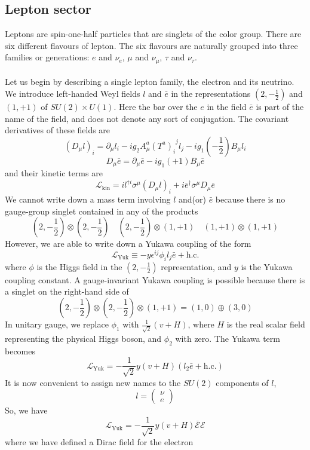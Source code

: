 \subsection{Lepton sector}
Leptons are spin-one-half particles that are singlets of the color group. There are six different flavours of lepton. The six flavours are naturally grouped into three families or generations: $e$ and $\nu_e$, $\mu$ and $\nu_{\mu}$, $\tau$ and $\nu_{\tau}$.
\\ \\
Let us begin by describing a single lepton family, the electron and its neutrino. We introduce left-handed Weyl fields $l$ and $\bar{e}$ in the representations $(2,-\frac{1}{2})$ and $(1,+1)$ of $SU(2)\times U(1)$. 
Here the bar over the $e$ in the field $\bar{e}$ is part of the name of the field, and does not denote any sort of conjugation. The covariant derivatives of these fields are
\[(D_{\mu}l)_i = \partial_{\mu}l_i - ig_2A^a_{\mu}(T^a)_{i}^{\phantom{j}j}l_j - ig_1(-\frac{1}{2})B_{\mu}l_i\]
\[D_{\mu}\bar{e} = \partial_{\mu}\bar{e} - ig_1(+1)B_{\mu}\bar{e}\]
and their kinetic terms are
\[\mathcal{L}_{\mathrm{kin}} = il^{\dagger i} \overline{\sigma}^{\mu}(D_{\mu}l)_i + i\bar{e}^{\dagger}\overline{\sigma}^{\mu}D_{\mu}\bar{e}\]
We cannot write down a mass term involving $l$ and(or) $\bar{e}$ because there is no gauge-group singlet contained in any of the products
\[(2,-\frac{1}{2}) \otimes (2,-\frac{1}{2}) \quad (2,-\frac{1}{2}) \otimes (1, +1) \quad (1, +1) \otimes (1, +1)\]
However, we are able to write down a Yukawa coupling of the form
\[\mathcal{L}_{\mathrm{Yuk}} \equiv -y\epsilon^{ij}\phi_i l_j \bar{e} + \mathrm{h.c.}\]
where $\phi$ is the Higgs field in the $(2,-\frac{1}{2})$ representation, and $y$ is the Yukawa coupling constant. A gauge-invariant Yukawa coupling is possible because there is a singlet on the right-hand side of
\[(2,-\frac{1}{2}) \otimes (2,-\frac{1}{2}) \otimes (1,+1) = (1,0) \oplus (3,0)\]
In unitary gauge, we replace $\phi_1$ with $\frac{1}{\sqrt{2}}(v+H)$, where $H$ is the real scalar field representing the physical Higgs boson, and $\phi_2$ with zero. The Yukawa term becomes
\[\mathcal{L}_{\mathrm{Yuk}} = -\frac{1}{\sqrt{2}}y(v+H)(l_2\bar{e} + \mathrm{h.c.})\]
It is now convenient to assign new names to the $SU(2)$ components of $l$,
\[l = \begin{pmatrix}
\nu \\ e
\end{pmatrix} \]
So, we have
\[\mathcal{L}_{\mathrm{Yuk}} = -\frac{1}{\sqrt{2}}y(v+H)\overline{\mathcal{E}}\mathcal{E}\]
where we have defined a Dirac field for the electron
